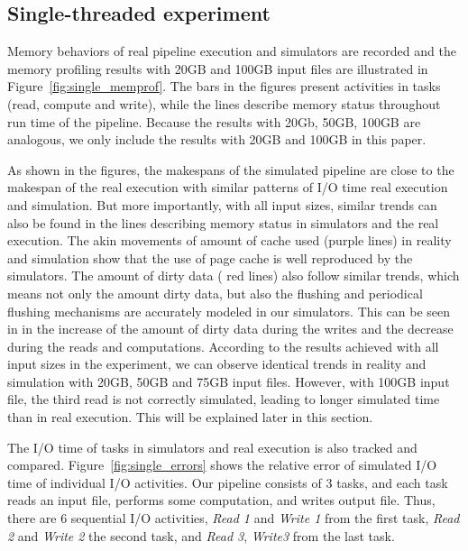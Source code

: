 \documentclass[conference]{IEEEtran}
\begin{document}
		\subsection{Single-threaded experiment}

			Memory behaviors of real pipeline execution and simulators are recorded 
			and the memory profiling results with 20GB and 100GB input files 
			are illustrated in Figure~\ref{fig:single_memprof}. 
			The bars in the figures present activities in tasks (read, compute and write), 
			while the lines describe memory status throughout run time of the pipeline. 
			Because the results with 20Gb, 50GB, 100GB are analogous, we only include 
			the results with 20GB and 100GB in this paper. 
			
			As shown in the figures, the makespans of the simulated pipeline are 
			close to the makespan of the real execution with similar patterns of I/O time 
			real execution and simulation. 
			But more importantly, with all input sizes, similar trends can also be found 
			in the lines describing memory status in simulators and the real execution. 
			The akin movements of amount of cache used (purple lines) in reality 
			and simulation show that the use of page cache is well reproduced by the simulators. 
			The amount of dirty data ( red lines) also follow similar trends, 
			which means not only the amount dirty data, but also the flushing and 
			periodical flushing mechanisms are accurately modeled in our simulators. 
			This can be seen in in the increase of the amount of dirty data during the writes 
			and the decrease during the reads and computations. 
			According to the results achieved with all input sizes in the experiment, 
			we can observe identical trends in reality and simulation with 20GB, 
			50GB and 75GB input files. However, with 100GB input file, 
			the third read is not correctly simulated, leading to longer simulated time 
			than in real execution. This will be explained later in this section.
			
			The I/O time of tasks in simulators and real execution is also tracked and compared. 
			Figure~\ref{fig:single_errors} shows the relative error of simulated I/O time 
			of individual I/O activities. 
			Our pipeline consists of 3 tasks, and each task reads an input file, 
			performs some computation, and writes output file. 
			Thus, there are 6 sequential I/O activities, \textit{Read 1} and \textit{Write 1} 
			from the first task, \textit{Read 2} and \textit{Write 2} the second task, 
			and \textit{Read 3}, \textit{Write3} from the last task.
			
\end{document}
